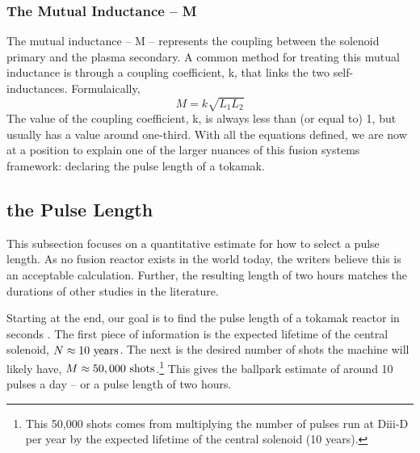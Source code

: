 \subsubsection{The Mutual Inductance -- M}

The mutual inductance -- M -- represents the coupling between the solenoid primary and the plasma secondary. A common method for treating this mutual inductance is through a coupling coefficient, k, that links the two self-inductances. Formulaically, 
\begin{equation}
	M = k \sqrt{ L_1 L_2 }
\end{equation}
The value of the coupling coefficient, k, is always less than (or equal to) 1, but usually has a value around one-third. With all the equations defined, we are now at a position to explain one of the larger nuances of this fusion systems framework: declaring the pulse length of a tokamak.

\subsection{ the Pulse Length}

\label{section:pulse}

This subsection focuses on a quantitative estimate for how to select a pulse length. As no fusion reactor exists in the world today, the writers believe this is an acceptable calculation. Further, the resulting length of two hours matches the durations of other studies in the literature.

Starting at the end, our goal is to find the pulse length of a tokamak reactor in seconds .  The first piece of information is the expected lifetime of the central solenoid, $ N \approx 10 \ \textnormal{years} $. The next is the desired number of shots the machine will likely have, $ M \approx 50,000 \ \textnormal{shots} $.\footnote{This 50,000 shots comes from multiplying the number of pulses run at Diii-D per year by the expected lifetime of the central solenoid (10 years).\cite{diiid}} This gives the ballpark estimate of around 10 pulses a day -- or a  pulse length of two hours.

